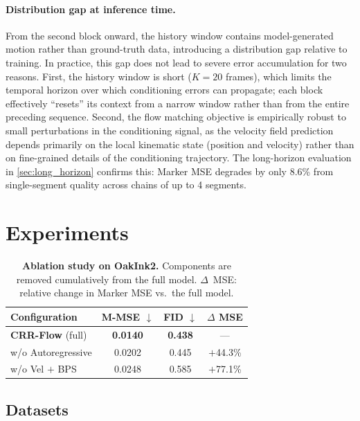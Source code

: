 \documentclass[sigconf, screen, review, anonymous]{acmart}
\begin{document}
\paragraph{Distribution gap at inference time.}
From the second block onward, the history window contains model-generated motion rather than ground-truth data, introducing a distribution gap relative to training. In practice, this gap does not lead to severe error accumulation for two reasons. First, the history window is short ($K{=}20$ frames), which limits the temporal horizon over which conditioning errors can propagate; each block effectively ``resets'' its context from a narrow window rather than from the entire preceding sequence. Second, the flow matching objective is empirically robust to small perturbations in the conditioning signal, as the velocity field prediction depends primarily on the local kinematic state (position and velocity) rather than on fine-grained details of the conditioning trajectory. The long-horizon evaluation in \cref{sec:long_horizon} confirms this: Marker MSE degrades by only 8.6\% from single-segment quality across chains of up to 4 segments.



\section{Experiments}
\label{sec:experiments}

\begin{table}[t]
  \caption{\textbf{Ablation study on OakInk2.} Components are removed cumulatively from the full model. $\Delta$~MSE: relative change in Marker MSE vs.\ the full model.}
  \label{tab:ablation}
  \centering
  \small
  \begin{tabular}{@{}lccc@{}}
    \toprule
    Configuration & M-MSE $\downarrow$ & FID $\downarrow$ & $\Delta$ MSE \\
    \midrule
    \textbf{CRR-Flow} (full) & \textbf{0.0140} & \textbf{0.438} & --- \\
    \quad w/o Autoregressive & 0.0202 & 0.445 & $+$44.3\% \\
    \quad w/o Vel $+$ BPS & 0.0248 & 0.585 & $+$77.1\% \\
    \bottomrule
  \end{tabular}
\end{table}


\subsection{Datasets}
\label{sec:datasets}
\end{document}
